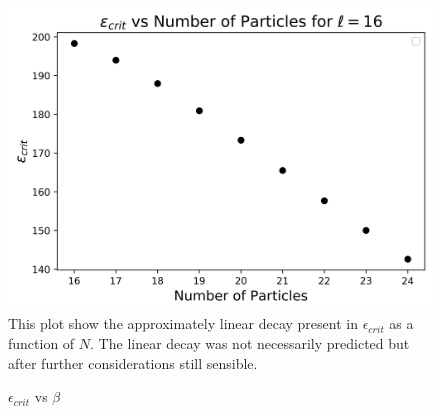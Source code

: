 \documentclass[twocolumn]{article}
\begin{document}
\begin{figure}[ht!]
\centering
\caption{$\epsilon_{crit}$ vs $\beta$}
\includegraphics[scale=.55]{Q3b}
\small{This plot show the approximately linear decay present in $\epsilon_{crit}$ as a function of $N$. The linear decay was not necessarily predicted but after further considerations still sensible.}
\end{figure}
\end{document}
